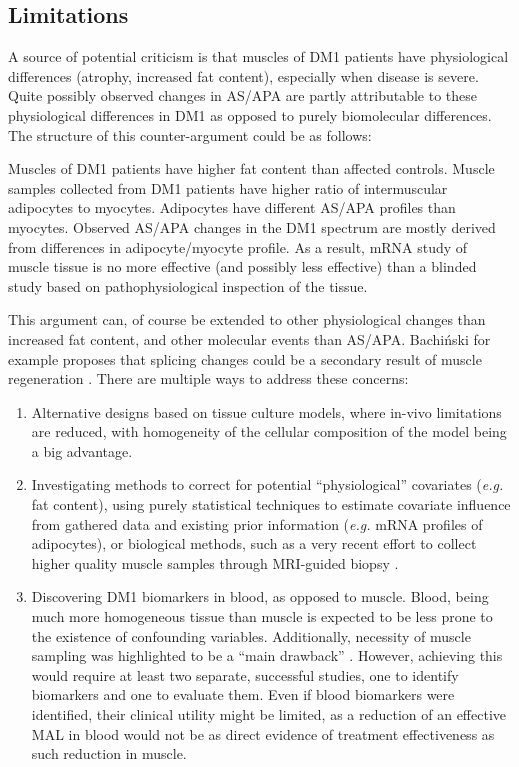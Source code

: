 \documentclass[10pt,letterpaper]{article}
\begin{document}
\subsection*{Limitations} \label{limitations}
A source of potential criticism is that muscles of DM1 patients have physiological differences (atrophy, increased fat content), especially when disease is severe. Quite possibly observed changes in AS/APA are partly attributable to these physiological differences in DM1 as opposed to purely biomolecular differences. The structure of this counter-argument could be as follows:

Muscles of DM1 patients have higher fat content than affected controls.
Muscle samples collected from DM1 patients have higher ratio of intermuscular adipocytes to myocytes.
Adipocytes have different AS/APA profiles than myocytes.
Observed AS/APA changes in the DM1 spectrum are mostly derived from differences in adipocyte/myocyte profile.
As a result, mRNA study of muscle tissue is no more effective (and possibly less effective) than a blinded study based on pathophysiological inspection of the tissue.

This argument can, of course be extended to other physiological changes than increased fat content, and other molecular events than AS/APA. Bachiński for example proposes that splicing changes could be a secondary result of muscle regeneration \cite{Bachinski2014}.
There are multiple ways to address these concerns:

\begin{enumerate}
\item Alternative designs based on tissue culture models, where in-vivo limitations are reduced, with homogeneity of the cellular composition of the model being a big advantage.
\item Investigating methods to correct for potential ``physiological'' covariates ({\it e.g.} fat content), using purely statistical techniques to estimate covariate influence from gathered data and existing prior information ({\it e.g.} mRNA profiles of adipocytes), or biological methods, such as a very recent effort to collect higher quality muscle samples through MRI-guided biopsy \cite{Saskie2018}.
\item Discovering DM1 biomarkers in blood, as opposed to muscle. Blood, being much more homogeneous tissue than muscle is expected to be less prone to the existence of confounding variables. Additionally, necessity of muscle sampling was highlighted to be a ``main drawback'' \cite{Nakamori2013}. However, achieving this would require at least two separate, successful studies, one to identify biomarkers and one to evaluate them. Even if blood biomarkers were identified, their clinical utility might be limited, as a reduction of an effective MAL in blood would not be as direct evidence of treatment effectiveness as such reduction in muscle.
\end{enumerate}
\end{document}
